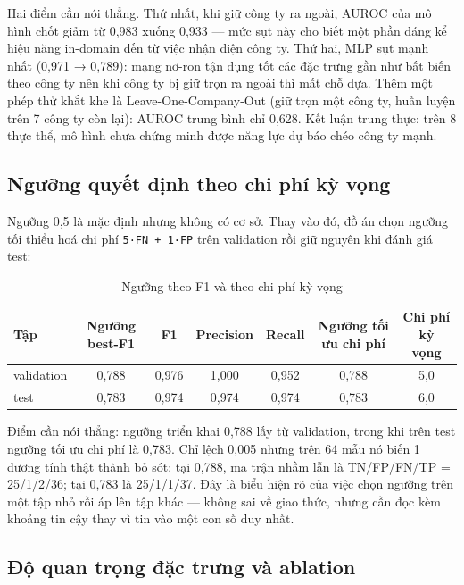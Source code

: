 \documentclass[13pt,a4paper]{extreport}
\begin{document}
Hai điểm cần nói thẳng. Thứ nhất, khi giữ công ty ra ngoài, AUROC của mô hình chốt giảm từ 0,983 xuống 0,933 — mức sụt này cho biết một phần đáng kể hiệu năng in-domain đến từ việc nhận diện công ty. Thứ hai, MLP sụt mạnh nhất (0,971 → 0,789): mạng nơ-ron tận dụng tốt các đặc trưng gần như bất biến theo công ty nên khi công ty bị giữ trọn ra ngoài thì mất chỗ dựa. Thêm một phép thử khắt khe là Leave-One-Company-Out (giữ trọn một công ty, huấn luyện trên 7 công ty còn lại): AUROC trung bình chỉ 0,628. Kết luận trung thực: trên 8 thực thể, mô hình chưa chứng minh được năng lực dự báo chéo công ty mạnh.

\clearpage

\subsection{Ngưỡng quyết định theo chi phí kỳ vọng}

Ngưỡng 0,5 là mặc định nhưng không có cơ sở. Thay vào đó, đồ án chọn ngưỡng tối thiểu hoá chi phí \texttt{5·FN + 1·FP} trên validation rồi giữ nguyên khi đánh giá test:

\begin{table}[H]
\centering
\caption{Ngưỡng theo F1 và theo chi phí kỳ vọng}
\begin{center}
\footnotesize
\begin{tabular}{|l|c|c|c|c|c|c|}
\hline
\textbf{Tập} & \textbf{Ngưỡng best-F1} & \textbf{F1} & \textbf{Precision} & \textbf{Recall} & \textbf{Ngưỡng tối ưu chi phí} & \textbf{Chi phí kỳ vọng} \\ \hline
validation & 0,788 & 0,976 & 1,000 & 0,952 & 0,788 & 5,0 \\ \hline
test & 0,783 & 0,974 & 0,974 & 0,974 & 0,783 & 6,0 \\ \hline
\end{tabular}
\end{center}
\end{table}

Điểm cần nói thẳng: ngưỡng triển khai 0,788 lấy từ validation, trong khi trên test ngưỡng tối ưu chi phí là 0,783. Chỉ lệch 0,005 nhưng trên 64 mẫu nó biến 1 dương tính thật thành bỏ sót: tại 0,788, ma trận nhầm lẫn là TN/FP/FN/TP = 25/1/2/36; tại 0,783 là 25/1/1/37. Đây là biểu hiện rõ của việc chọn ngưỡng trên một tập nhỏ rồi áp lên tập khác — không sai về giao thức, nhưng cần đọc kèm khoảng tin cậy thay vì tin vào một con số duy nhất.

\subsection{Độ quan trọng đặc trưng và ablation}
\end{document}
